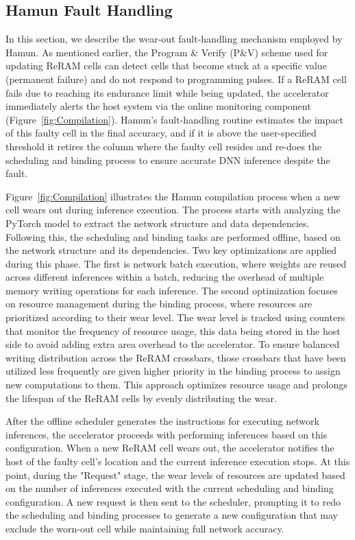 \subsection{Hamun Fault Handling}\label{subs:Scheduler Fault handling}
In this section, we describe the wear-out fault-handling mechanism employed by Hamun. As mentioned earlier, the Program \& Verify (P\&V) scheme used for updating ReRAM cells can detect cells that become stuck at a specific value (permanent failure) and do not respond to programming pulses. If a ReRAM cell fails due to reaching its endurance limit while being updated, the accelerator immediately alerts the host system via the online monitoring component (Figure~\ref{fig:Compilation}). Hamun's fault-handling routine estimates the impact of this faulty cell in the final accuracy, and if it is above the user-specified threshold it retires the column where the faulty cell resides and re-does the scheduling and binding process to ensure accurate DNN inference despite the fault.

Figure~\ref{fig:Compilation} illustrates the Hamun compilation process when a new cell wears out during inference execution. The process starts with analyzing the PyTorch model to extract the network structure and data dependencies. Following this, the scheduling and binding tasks are performed offline, based on the network structure and its dependencies. Two key optimizations are applied during this phase. The first is network batch execution, where weights are reused across different inferences within a batch, reducing the overhead of multiple memory writing operations for each inference. The second optimization focuses on resource management during the binding process, where resources are prioritized according to their wear level. The wear level is tracked using counters that monitor the frequency of resource usage, this data being stored in the host side to avoid adding extra area overhead to the accelerator. To ensure balanced writing distribution across the ReRAM crossbars, those crossbars that have been utilized less frequently are given higher priority in the binding process to assign new computations to them. This approach optimizes resource usage and prolongs the lifespan of the ReRAM cells by evenly distributing the wear.

After the offline scheduler generates the instructions for executing network inferences, the accelerator proceeds with performing inferences based on this configuration. When a new ReRAM cell wears out, the accelerator notifies the host of the faulty cell's location and the current inference execution stops. At this point, during the "Request" stage, the wear levels of resources are updated based on the number of inferences executed with the current scheduling and binding configuration. A new request is then sent to the scheduler, prompting it to redo the scheduling and binding processes to generate a new configuration that may exclude the worn-out cell while maintaining full network accuracy.


